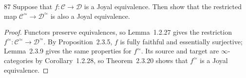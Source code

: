 \begin{exercise}{87}
Suppose that $f\colon\mathcal C\to\mathcal D$ is a Joyal equivalence. Then show
that the restricted map $\mathcal C^{\simeq}\to\mathcal D^{\simeq}$ is also a
Joyal equivalence.

\begin{proof}
Functors preserve equivalences, so Lemma~1.2.27 gives the restriction
$f^{\simeq}\colon\mathcal C^{\simeq}\to\mathcal D^{\simeq}$.
By Proposition~2.3.5, $f$ is fully faithful and essentially surjective;
Lemma~2.3.9 gives the same properties for $f^{\simeq}$.
Its source and target are $\infty$-categories by Corollary~1.2.28,
so Theorem~2.3.20 shows that $f^{\simeq}$ is a Joyal equivalence.
\end{proof}
\end{exercise}
